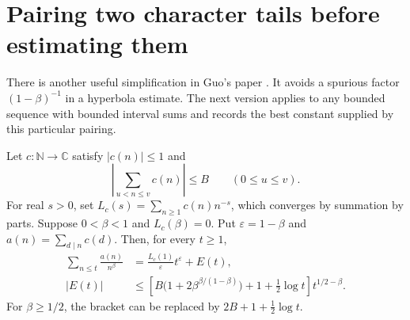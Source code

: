 \section{Pairing two character tails before estimating them}
\label{sz-tails-section}

There is another useful simplification in Guo's paper \cite{sz-guo}.
It avoids a spurious factor $(1-\beta)^{-1}$ in a hyperbola estimate.
The next version applies to any bounded sequence with bounded interval sums
and records the best constant supplied by this particular pairing.

\begin{proposition}\label{sz-paired-tails}
Let $c:\mathbb N\to\mathbb C$ satisfy $|c(n)|\le1$ and
\[
 \left|\sum_{u<n\le v}c(n)\right|\le B\qquad(0\le u\le v).
\]
For real $s>0$, set $L_c(s)=\sum_{n\ge1}c(n)n^{-s}$, which converges
by summation by parts. Suppose $0<\beta<1$ and $L_c(\beta)=0$.
Put $\varepsilon=1-\beta$ and $a(n)=\sum_{d\mid n}c(d)$.
Then, for every $t\ge1$,
\begin{align}\label{sz-paired-main}
 \sum_{n\le t}\frac{a(n)}{n^\beta}
 &=\frac{L_c(1)}{\varepsilon}t^\varepsilon+E(t),\\
 |E(t)|&\le
 \left[B\bigl(1+2\beta^{\beta/(1-\beta)}\bigr)
                  +1+\tfrac12\log t\right]t^{1/2-\beta}.\nonumber
\end{align}
For $\beta\ge1/2$, the bracket can be replaced by
$2B+1+\tfrac12\log t$.
\end{proposition}
